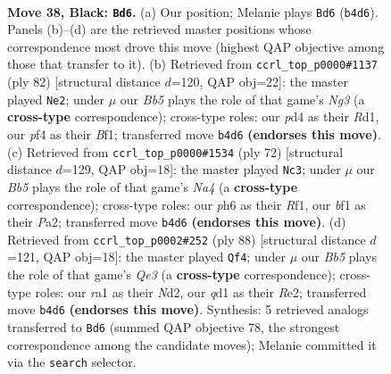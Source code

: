 \documentclass[11pt]{article}
\begin{document}
\clearpage

\begin{figure}[p]\centering
\begin{subfigure}{0.46\textwidth}\centering
\resizebox{\linewidth}{!}{%
\newchessgame
\chessboard[
  setfen={2b4r/p2r1k1p/n1q3pP/1p1p1pP1/1b1P1P1K/1P2P3/4N3/R2Q1BNR b - - 23 38},
  showmover=false,
  pgfstyle=straightmove, color=movearrow, markmove={b4-d6}
]}
\caption{}
\end{subfigure}\hfill
\begin{subfigure}{0.46\textwidth}\centering
\resizebox{\linewidth}{!}{%
\newchessgame
\chessboard[
  setfen={1r2q1k1/2r1bpp1/1p1ppnnp/1P6/1P2P3/1Q2R1NP/1B3PP1/3R1BK1 w - - 5 42},
  showmover=false,
  pgfstyle=straightmove, color=movearrow, markmove={g3-e2}
]}
\caption{}
\end{subfigure}
\\[4pt]
\begin{subfigure}{0.46\textwidth}\centering
\resizebox{\linewidth}{!}{%
\newchessgame
\chessboard[
  setfen={2r5/r3q1pk/2p1pn1p/p2p1p2/N2P3P/bP2PPP1/P1RBQ1K1/5R2 w - - 5 37},
  showmover=false,
  pgfstyle=straightmove, color=movearrow, markmove={a4-c3}
]}
\caption{}
\end{subfigure}\hfill
\begin{subfigure}{0.46\textwidth}\centering
\resizebox{\linewidth}{!}{%
\newchessgame
\chessboard[
  setfen={2n3r1/3bq2r/kp1np2p/p2p3P/P1pP2P1/2P1Q1BB/2PNR3/R6K w - - 3 45},
  showmover=false,
  pgfstyle=straightmove, color=movearrow, markmove={e3-f4}
]}
\caption{}
\end{subfigure}
\caption{\textbf{Move 38, Black: \texttt{Bd6}.} (a) Our position; Melanie plays \texttt{Bd6} (\texttt{b4d6}). Panels (b)--(d) are the retrieved master positions whose correspondence most drove this move (highest QAP objective among those that transfer to it). (b) Retrieved from \texttt{ccrl\_top\_p0000\#1137} (ply 82) [structural distance $d$=120, QAP obj=22]: the master played \texttt{Ne2}; under $\mu$ our \emph{Bb5} plays the role of that game's \emph{Ng3} (a \textbf{cross-type} correspondence); cross-type roles: our \emph{p}d4 as their \emph{R}d1, our \emph{p}f4 as their \emph{B}f1; transferred move \texttt{b4d6} \textbf{(endorses this move)}. (c) Retrieved from \texttt{ccrl\_top\_p0000\#1534} (ply 72) [structural distance $d$=129, QAP obj=18]: the master played \texttt{Nc3}; under $\mu$ our \emph{Bb5} plays the role of that game's \emph{Na4} (a \textbf{cross-type} correspondence); cross-type roles: our \emph{p}h6 as their \emph{R}f1, our \emph{b}f1 as their \emph{P}a2; transferred move \texttt{b4d6} \textbf{(endorses this move)}. (d) Retrieved from \texttt{ccrl\_top\_p0002\#252} (ply 88) [structural distance $d$=121, QAP obj=18]: the master played \texttt{Qf4}; under $\mu$ our \emph{Bb5} plays the role of that game's \emph{Qe3} (a \textbf{cross-type} correspondence); cross-type roles: our \emph{r}a1 as their \emph{N}d2, our \emph{q}d1 as their \emph{R}e2; transferred move \texttt{b4d6} \textbf{(endorses this move)}. Synthesis: 5 retrieved analogs transferred to \texttt{Bd6} (summed QAP objective 78, the strongest correspondence among the candidate moves); Melanie committed it via the \texttt{search} selector.}
\label{fig:thought-m75}
\end{figure}
\end{document}

